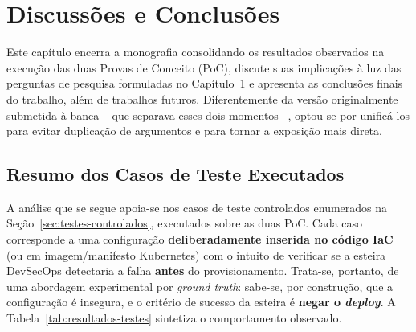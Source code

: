 \chapter{Discussões e Conclusões}
\label{cap:discussao}

Este capítulo encerra a monografia consolidando os resultados observados na execução das duas Provas de Conceito (PoC), discute suas implicações à luz das perguntas de pesquisa formuladas no Capítulo~1 e apresenta as conclusões finais do trabalho, além de trabalhos futuros. Diferentemente da versão originalmente submetida à banca -- que separava esses dois momentos --, optou-se por unificá-los para evitar duplicação de argumentos e para tornar a exposição mais direta.

\section{Resumo dos Casos de Teste Executados}
\label{sec:resumo-testes}

A análise que se segue apoia-se nos casos de teste controlados enumerados na Seção~\ref{sec:testes-controlados}, executados sobre as duas PoC. Cada caso corresponde a uma configuração \textbf{deliberadamente inserida no código IaC} (ou em imagem/manifesto Kubernetes) com o intuito de verificar se a esteira DevSecOps detectaria a falha \textbf{antes} do provisionamento. Trata-se, portanto, de uma abordagem experimental por \textit{ground truth}: sabe-se, por construção, que a configuração é insegura, e o critério de sucesso da esteira é \textbf{negar o \textit{deploy}}. A Tabela~\ref{tab:resultados-testes} sintetiza o comportamento observado.

